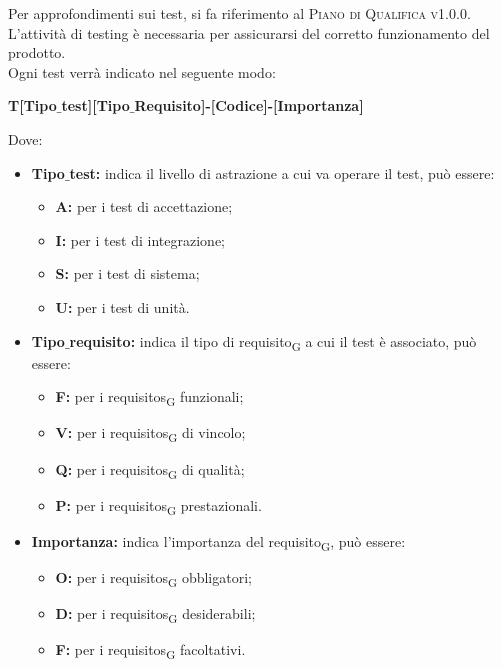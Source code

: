     Per approfondimenti sui test, si fa riferimento al \textsc{Piano di Qualifica v1.0.0}.
    L'attività di testing è necessaria per assicurarsi del corretto funzionamento del prodotto.\\Ogni test verrà indicato nel seguente modo:\\
    \begin{center}
    	\textbf{T[Tipo$\_$test][Tipo$\_$Requisito]-[Codice]-[Importanza]}
    \end{center}
    Dove:
    \begin{itemize}
    	\item \textbf{Tipo$\_$test:} indica il livello di astrazione a cui va operare il test, può essere:
    	\begin{itemize}
    		\item \textbf{A:} per i test di accettazione;
    		\item \textbf{I:} per i test di integrazione;
    		\item \textbf{S:} per i test di sistema;
    		\item \textbf{U:} per i test di unità.
    	\end{itemize}
    	\item \textbf{Tipo$\_$requisito:} indica il tipo di \gls{requisito}\textsubscript{G} a cui il test è associato, può essere:
    	\begin{itemize}
    		\item \textbf{F:} per i \glspl{requisito}\textsubscript{G} funzionali;
    		\item \textbf{V:} per i \glspl{requisito}\textsubscript{G} di vincolo;
    		\item \textbf{Q:} per i \glspl{requisito}\textsubscript{G} di qualità;
    		\item \textbf{P:} per i \glspl{requisito}\textsubscript{G} prestazionali.
    	\end{itemize}
    	\item \textbf{Importanza:} indica l'importanza del \gls{requisito}\textsubscript{G}, può essere:
    	\begin{itemize}
    		\item \textbf{O:} per i \glspl{requisito}\textsubscript{G} obbligatori;
    		\item \textbf{D:} per i \glspl{requisito}\textsubscript{G} desiderabili;
    		\item \textbf{F:} per i \glspl{requisito}\textsubscript{G} facoltativi.
    	\end{itemize}
    \end{itemize}
